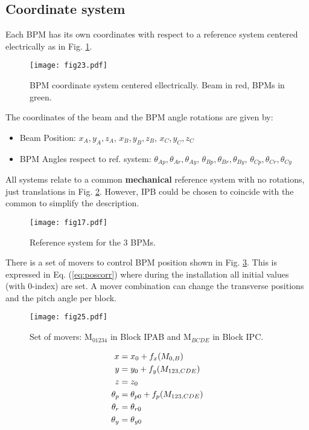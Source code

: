\subsection{Coordinate system}\par
Each BPM has its own coordinates with respect to a reference system centered electrically as in Fig. \ref{f:BPMcoordinate}.\par
\begin{figure}[hbt]
\centering
  \texttt{[image: fig23.pdf]}\caption{BPM coordinate system centered ellectrically. {\color{red}Beam in red}, {\color{forestgreen} BPMs in green}.}\label{f:BPMcoordinate}
\end{figure}
The coordinates of the beam and the BPM angle rotations are given by:
\begin{itemize}
 \item Beam Position: $x_A,y_A,z_A$, $x_B,y_B,z_B$, $x_C,y_C,z_C$
 \item BPM Angles respect to ref. system:  $\theta_{Ap},\theta_{Ar},\theta_{Ay}$, $\theta_{Bp},\theta_{Br},\theta_{By}$, $\theta_{Cp},\theta_{Cr},\theta_{Cy}$
\end{itemize}
All systems relate to a common \textbf{mechanical} reference system with no rotations, just translations in Fig. \ref{f:ref3BPMs}. However, IPB  could be chosen to coincide with the common to simplify the description.\par
\begin{figure}
\centering
\texttt{[image: fig17.pdf]}\caption{Reference system for the 3 BPMs.}\label{f:ref3BPMs}
\end{figure}
There is a set of movers to control BPM position shown in Fig. \ref{f:moverss}. This is expressed in Eq. (\ref{eq:poscorr}) where during the installation all initial values (with 0-index) are set. A mover combination can change the transverse positions and the pitch angle per block.\par
\begin{figure}
\centering
\texttt{[image: fig25.pdf]}\caption{Set of movers: M$_{01234}$ in Block IPAB and M$_{BCDE}$ in Block IPC.}\label{f:moverss}
\end{figure}
\begin{align}
 x &= x_0+f_x(M_{0,B})\label{eq:poscorr}\\
 y &= y_0+f_y(M_{123,CDE})\notag\\
 z &= z_0\notag\\
 \theta_p &= \theta_{p0}+f_p(M_{123,CDE})\notag\\
 \theta_r &= \theta_{r0}\notag\\
 \theta_y &= \theta_{y0}\notag
\end{align}\par

